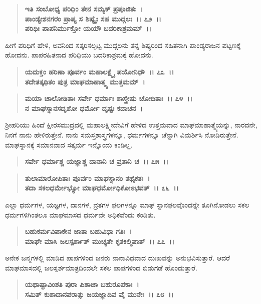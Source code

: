 \begin{verse}
\textbf{ಇತಿ ಸಂಬೋಧ್ಯ ಪರಿಧಿಂ ತೇನ ಸಮ್ಯಕ್ ಪ್ರಪೂಜಿತಃ~।}\\\textbf{ಪಾಂಡ್ಯೇಶನಗರಂ ಪ್ರಾಪ್ಯ ಸ ಶಿಷ್ಯೈಃ ಸಹ ಮುದ್ಗಲಃ~।। ೭೨~।।}\\\textbf{ಪರಿಧಿಃ ಪಾಪನಿರ್ಮುಕ್ತೋ ಯಯೌ ಬದರಿಕಾಶ್ರಮಮ್~।।}
\end{verse}

ಹೀಗೆ ಪರಿಧಿಗೆ ಹೇಳಿ, ಅವನಿಂದ ಸತ್ಕರಿಸಲ್ಪಟ್ಟ ಮುದ್ಗಲನು ತನ್ನ ಶಿಷ್ಯರಿಂದ ಸಹಿತನಾಗಿ ಪಾಂಡ್ಯರಾಜನ ಪಟ್ಟಣಕ್ಕೆ ಹೋದನು. ಪಾಪರಹಿತನಾದ ಪರಿಧಿಯು ಬದರಿಕಾಶ್ರಮಕ್ಕೆ ಹೋದನು.

\begin{verse}
\textbf{ಯದುಕ್ತಂ ಹರಿಣಾ ಪೂರ್ವಂ ಮಹಾಲಕ್ಷ್ಮೈ ಪಯೋನಿಧೌ~।। ೭೩~।।}\\\textbf{ತದೇತತ್ಕಥಿತಂ ಪುತ್ರ ಮಾಘಮಾಹಾತ್ಮ್ಯ ಮುತ್ತಮಮ್~। }
\end{verse}

\begin{verse}
\textbf{ಮಯಾ ಚಾಲೋಡಿತಾಃ ಸರ್ವೇ ಧರ್ಮಾಃ ಶಾಸ್ತ್ರೇಷು ಚೋದಿತಾಃ~।। ೭೪~।।}\\\textbf{ನ ಮಾಘಸ್ನಾನಸದೃಶೋ ಧರ್ಮೋ ದೃಷ್ಟಃ ಕದಾಚನ~।}
\end{verse}

ಶ‍್ರೀಹರಿಯು ಹಿಂದೆ ಕ್ಷೀರಸಮುದ್ರದಲ್ಲಿ ಮಹಾಲಕ್ಷ್ಮೀದೇವಿಗೆ ಹೇಳಿದ ಉತ್ತಮವಾದ ಮಾಘಮಾಹಾತ್ಮ್ಯೆಯನ್ನು, ನಾರದನೇ, ನಿನಗೆ ನಾನು ಹೇಳಿರುತ್ತೇನೆ. ನಾನು ಸಮಸ್ತಶಾಸ್ತ್ರಗಳನ್ನೂ, ಧರ್ಮಗಳನ್ನೂ ಚೆನ್ನಾಗಿ ವಿಮರ್ಶಿಸಿ ನೋಡಿರುತ್ತೇನೆ. ಮಾಘಸ್ನಾನಕ್ಕೆ ಸಮಾನವಾದ ಸತ್ಕರ್ಮ ಇನ್ನೊಂದು ಕಂಡಿಲ್ಲ.

\begin{verse}
\textbf{ಸರ್ವೇ ಧರ್ಮಾಶ್ಚ ಯಜ್ಞಾಶ್ಚ ದಾನಾನಿ ಚ ವ್ರತಾನಿ ಚ~।। ೭೫~।।} 
\end{verse}

\begin{verse}
\textbf{ತುಲಾಮಾರೋಪಿತಾಃ ಪೂರ್ವಂ ಮಾಘಸ್ನಾನಂ ತಥೈಕತಃ~।}\\\textbf{ತದಾ ಸಕಲಧರ್ಮೇಭ್ಯೋ ಮಾಘಧರ್ಮೋಧಿಕೋಽಭವತ್~।। ೭೬~।।}
\end{verse}

ಎಲ್ಲಾ ಧರ್ಮಗಳ, ಯಜ್ಞಗಳ, ದಾನಗಳ, ವ್ರತಗಳ ಫಲಗಳನ್ನೂ ಮಾಘ ಸ್ನಾನಫಲವೊಂದನ್ನೇ ತೂಗಿನೋಡಲು ಸಕಲ ಧರ್ಮಗಳಿಗಿಂತಲೂ ಮಾಘಮಾಸದ ಧರ್ಮವೇ ಅಧಿಕವೆಂದು ಕಂಡಿತು.

\begin{verse}
\textbf{ಬಹುಕರ್ಮವಿಪಾಕೇನ ಜಾತಾ ಬಹುವಿಧಾ ಗತಿಃ~।}\\\textbf{ಮಾಘೇ ಮಾಸಿ ಜಲಸ್ಪರ್ಶಾತ್ ಮುಚ್ಯತೇ ಕೃತಕಿಲ್ಮಿಷಾತ್~।। ೭೭~।।}
\end{verse}

ಅನೇಕ ಜನ್ಮಗಳಲ್ಲಿ ಮಾಡಿದ ಪಾಪಗಳಿಂದ ಜನರು ನಾನಾವಿಧವಾದ ದುಃಖವನ್ನು ಅನುಭವಿಸುತ್ತಾರೆ. ಆದರೆ ಮಾಘಮಾಸದಲ್ಲಿ ಜಲಸ್ಪರ್ಶಮಾತ್ರದಿಂದಲೇ ಸಕಲ ಪಾಪಗಳಿಂದ ಬಿಡುಗಡೆ ಹೊಂದುತ್ತಾರೆ.

\begin{verse}
\textbf{ಯಥಾಷ್ಟಾವಿಂಶತಿ ಪುರಾ ಪಿಶಾಚಾ ಬಹುರೂಪಕಾಃ~।}\\\textbf{ಸಮಿತ್ ಕುಶಾದಾನಪರಾತ್ಸು ಜಯಜ್ಞಾದಿವ ವೈ ಮುನೇಃ~।। ೭೮~।।}
\end{verse}

